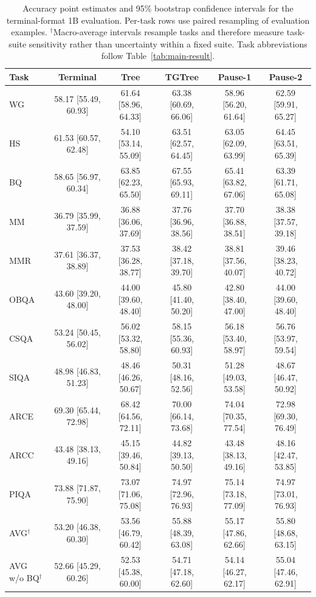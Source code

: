 \documentclass[11pt]{article}
\begin{document}
\begin{table}[p]
  \centering
  \footnotesize
  \renewcommand{\arraystretch}{1.05}
  \setlength{\tabcolsep}{2.8pt}
  \begin{tabular}{lccccc}
    \toprule
    Task & Terminal & Tree & TGTree & Pause-1 & Pause-2 \\
    \midrule
    WG   & 58.17 [55.49, 60.93] & 61.64 [58.96, 64.33] & 63.38 [60.69, 66.06] & 58.96 [56.20, 61.64] & 62.59 [59.91, 65.27] \\
    HS   & 61.53 [60.57, 62.48] & 54.10 [53.14, 55.09] & 63.51 [62.57, 64.45] & 63.05 [62.09, 63.99] & 64.45 [63.51, 65.39] \\
    BQ   & 58.65 [56.97, 60.34] & 63.85 [62.23, 65.50] & 67.55 [65.93, 69.11] & 65.41 [63.82, 67.06] & 63.39 [61.71, 65.08] \\
    MM   & 36.79 [35.99, 37.59] & 36.88 [36.06, 37.69] & 37.76 [36.96, 38.56] & 37.70 [36.88, 38.51] & 38.38 [37.57, 39.18] \\
    MMR  & 37.61 [36.37, 38.89] & 37.53 [36.28, 38.77] & 38.42 [37.18, 39.70] & 38.81 [37.56, 40.07] & 39.46 [38.23, 40.72] \\
    OBQA & 43.60 [39.20, 48.00] & 44.00 [39.60, 48.40] & 45.80 [41.40, 50.20] & 42.80 [38.40, 47.00] & 44.00 [39.60, 48.40] \\
    CSQA & 53.24 [50.45, 56.02] & 56.02 [53.32, 58.80] & 58.15 [55.36, 60.93] & 56.18 [53.40, 58.97] & 56.76 [53.97, 59.54] \\
    SIQA & 48.98 [46.83, 51.23] & 48.46 [46.26, 50.67] & 50.31 [48.16, 52.56] & 51.28 [49.03, 53.58] & 48.67 [46.47, 50.92] \\
    ARCE & 69.30 [65.44, 72.98] & 68.42 [64.56, 72.11] & 70.00 [66.14, 73.68] & 74.04 [70.35, 77.54] & 72.98 [69.30, 76.49] \\
    ARCC & 43.48 [38.13, 49.16] & 45.15 [39.46, 50.84] & 44.82 [39.13, 50.50] & 43.48 [38.13, 49.16] & 48.16 [42.47, 53.85] \\
    PIQA & 73.88 [71.87, 75.90] & 73.07 [71.06, 75.08] & 74.97 [72.96, 76.93] & 75.14 [73.18, 77.09] & 74.97 [73.01, 76.93] \\
    \midrule
    AVG$^\dagger$ & 53.20 [46.38, 60.30] & 53.56 [46.79, 60.42] & 55.88 [48.39, 63.08] & 55.17 [47.86, 62.66] & 55.80 [48.68, 63.15] \\
    AVG w/o BQ$^\dagger$ & 52.66 [45.29, 60.26] & 52.53 [45.38, 60.00] & 54.71 [47.18, 62.60] & 54.14 [46.27, 62.17] & 55.04 [47.46, 62.91] \\
    \bottomrule
  \end{tabular}
  \caption{Accuracy point estimates and 95\% bootstrap confidence intervals for the terminal-format 1B evaluation. Per-task rows use paired resampling of evaluation examples. $^\dagger$Macro-average intervals resample tasks and therefore measure task-suite sensitivity rather than uncertainty within a fixed suite. Task abbreviations follow Table~\ref{tab:main-result}.}
  \label{tab:bootstrap-ci}
\end{table}
\end{document}
